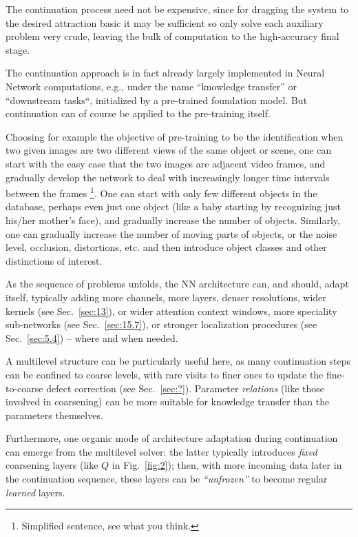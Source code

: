 \documentclass{article} %
\begin{document}
The continuation process need not be expensive, since for dragging the system to the desired attraction basic it may be sufficient so only solve each auxiliary problem very crude, leaving the bulk of computation to the high-accuracy final stage.

The continuation approach is in fact already largely implemented in Neural Network computations, e.g., under the name ``knowledge transfer'' or ``downstream tasks``, initialized by a pre-trained foundation model. But continuation can of course be applied to the pre-training itself.

Choosing for example the objective of pre-training to be the identification when two given images are two different views of the same object or scene, one can start with the easy case that the two images are adjacent video frames, and gradually develop the network to deal with increasingly longer time intervals between the frames \footnote{Simplified sentence, see what you think.}. One can start with only few different objects in the database, perhaps even just one object (like a baby starting by recognizing just his/her mother's face), and gradually increase the number of objects. Similarly, one can gradually increase the number of moving parts of objects, or the noise level, occlusion, distortions, etc. and then introduce object classes and other distinctions of interest.

As the sequence of problems unfolds, the NN architecture can, and should, adapt itself, typically adding more channels, more layers, denser resolutions, wider kernels (see Sec.~\ref{sec:13}), or wider attention context windows, more speciality sub-networks (see Sec.~\ref{sec:15.7}), or stronger localization procedures (see Sec.~\ref{sec:5.4}) -- where and when needed.

A multilevel structure can be particularly useful here, as many continuation steps can be confined to coarse levels, with rare visits to finer ones to update the fine-to-coarse defect correction (see Sec.~\ref{sec:?}). Parameter {\it relations} (like those involved in coarsening) can be more suitable for knowledge transfer than the parameters themselves.

Furthermore, one organic mode of architecture adaptation during continuation can emerge from the multilevel solver: the latter typically introduces {\it fixed} coarsening layers (like $Q$ in Fig.~\ref{fig:2}); then, with more incoming data later in the continuation sequence, these layers can be {\it ``unfrozen''} to become regular {\it learned} layers.
\end{document}
